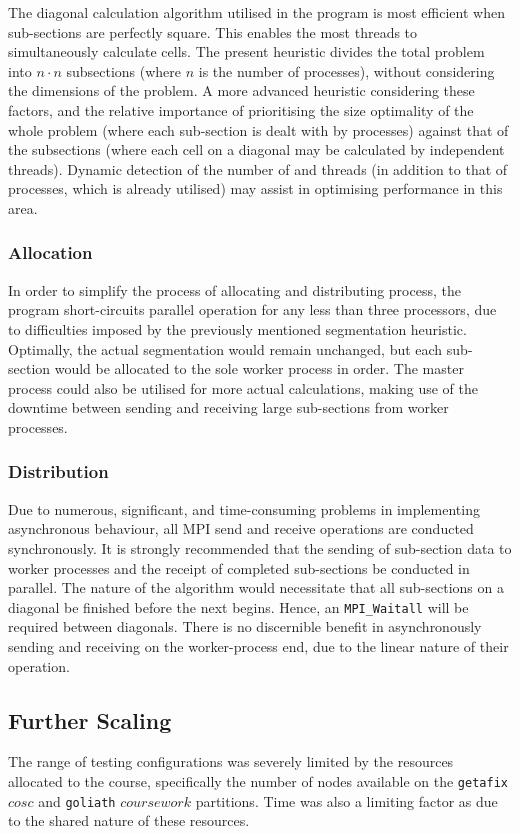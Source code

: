 The diagonal calculation algorithm utilised in the program is most efficient when sub-sections are perfectly square. This enables the most threads to simultaneously calculate cells. The present heuristic divides the total problem into $n \cdot n$ subsections (where $n$ is the number of processes), without considering the dimensions of the problem. A more advanced heuristic considering these factors, and the relative importance of prioritising the size optimality of the whole problem (where each sub-section is dealt with by processes) against that of the subsections (where each cell on a diagonal may be calculated by independent threads). Dynamic detection of the number of and threads (in addition to that of processes, which is already utilised) may assist in optimising performance in this area.

\subsubsection{Allocation}
In order to simplify the process of allocating and distributing process, the program short-circuits parallel operation for any less than three processors, due to difficulties imposed by the previously mentioned segmentation heuristic. Optimally, the actual segmentation would remain unchanged, but each sub-section would be allocated to the sole worker process in order. The master process could also be utilised for more actual calculations, making use of the downtime between sending and receiving large sub-sections from worker processes.

\subsubsection{Distribution}
Due to numerous, significant, and time-consuming problems in implementing asynchronous behaviour, all MPI send and receive operations are conducted synchronously. It is strongly recommended that the sending of sub-section data to worker processes and the receipt of completed sub-sections be conducted in parallel. The nature of the algorithm would necessitate that all sub-sections on a diagonal be finished before the next begins. Hence, an \lstinline{MPI_Waitall} will be required between diagonals. There is no discernible benefit in asynchronously sending and receiving on the worker-process end, due to the linear nature of their operation.

\subsection{Further Scaling}
The range of testing configurations was severely limited by the resources allocated to the course, specifically the number of nodes available on the \lstinline{getafix} $cosc$ and \lstinline{goliath} $coursework$ partitions. Time was also a limiting factor as due to the shared nature of these resources.

